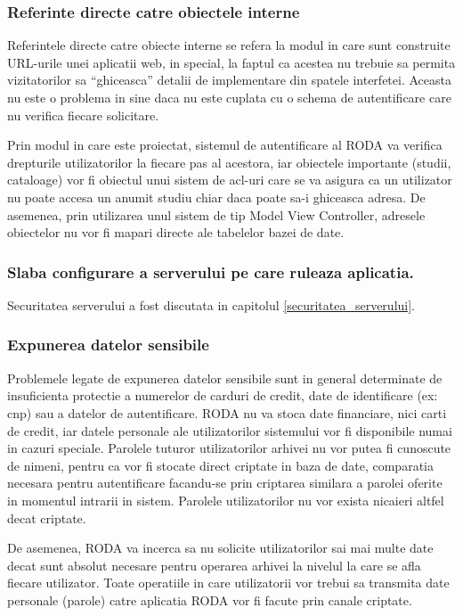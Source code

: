 \subsubsection{Referinte directe catre obiectele interne}

Referintele directe catre obiecte interne se refera la modul in care sunt construite URL-urile unei aplicatii web, in
special, la faptul ca acestea nu trebuie sa permita vizitatorilor sa ``ghiceasca'' detalii de implementare din spatele
interfetei. Aceasta nu este o problema in sine daca nu este cuplata cu o schema de autentificare care nu verifica
fiecare solicitare.

Prin modul in care este proiectat, sistemul de autentificare al RODA va verifica drepturile utilizatorilor la fiecare
pas al acestora, iar obiectele importante (studii, cataloage) vor fi obiectul unui sistem de acl-uri care se va asigura
ca un utilizator nu poate accesa un anumit studiu chiar daca poate sa-i ghiceasca adresa. De asemenea, prin utilizarea
unul sistem de tip Model View Controller, adresele obiectelor nu vor fi mapari directe ale tabelelor bazei de date.

\subsubsection{Slaba configurare a serverului pe care ruleaza aplicatia. }

Securitatea serverului a fost discutata in capitolul
\ref{securitatea_serverului}.

\subsubsection{Expunerea datelor sensibile}

Problemele legate de expunerea datelor sensibile sunt in general determinate de insuficienta protectie a numerelor de
carduri de credit, date de identificare (ex: cnp) sau a datelor de autentificare. RODA nu va stoca date financiare,
nici carti de credit, iar datele personale ale utilizatorilor sistemului vor fi disponibile numai in cazuri speciale.
Parolele tuturor utilizatorilor arhivei nu vor putea fi cunoscute de nimeni, pentru ca vor fi stocate direct criptate
in baza de date, comparatia necesara pentru autentificare facandu-se prin criptarea similara a parolei oferite in
momentul intrarii in sistem. Parolele utilizatorilor nu vor exista nicaieri altfel decat criptate.

De asemenea, RODA va incerca sa nu solicite utilizatorilor sai mai multe date decat sunt absolut necesare pentru
operarea arhivei la nivelul la care se afla fiecare utilizator. Toate operatiile in care utilizatorii vor trebui sa
transmita date personale (parole) catre aplicatia RODA vor fi facute prin canale criptate.

